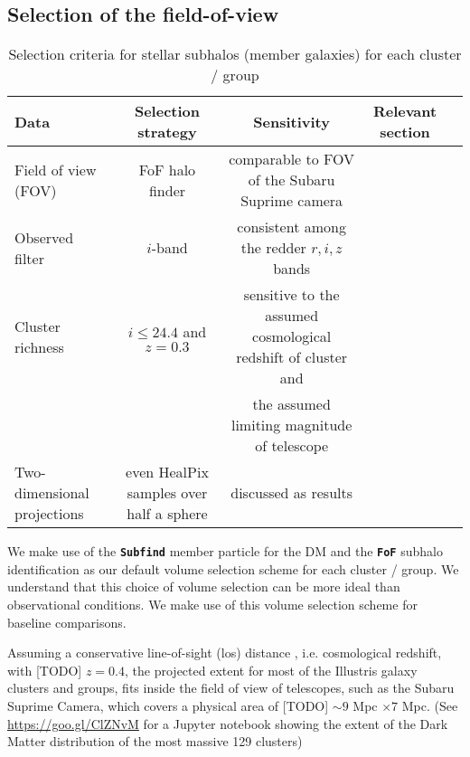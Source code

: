 \subsection{Selection of the field-of-view}
\label{sec:FOV}

\begin{table*}
\begin{center}
\begin{minipage}{180mm} 
	\caption{ Selection criteria for stellar subhalos (member galaxies) for each
		cluster / group 
\label{tab:member_galaxy_selections}} 
	\begin{tabular}{@{}lcccc@{}}
\hline 
Data &  Selection strategy  & Sensitivity & Relevant section  \\ \hline
Field of view (FOV) & FoF halo finder& comparable to FOV of the Subaru
Suprime camera &   \\ 
Observed filter & $i$-band & consistent among the redder $r, i, z$ bands &   \\ 
Cluster richness  & $i \leq 24.4$ and $z = 0.3$  & sensitive to
the assumed cosmological redshift of cluster and &    \\ 
& & the assumed limiting magnitude of telescope &   \\
Two-dimensional projections & even HealPix samples over half a sphere &
discussed as results  & \\  
\hline
\end{tabular} 
\label{tab:selection_criteria} 
\footnotesize{
}
\end{minipage}
\end{center} 
\end{table*}

We make use of the {\bf \texttt{Subfind}} member particle for the DM and the 
{\bf \texttt{FoF}} subhalo identification as our
default volume selection scheme for each cluster / group.
We understand that this choice of volume selection can be more ideal than
observational conditions. We make use of this volume selection scheme
for baseline comparisons. 

Assuming a conservative line-of-sight (los) distance 
, i.e. cosmological redshift, with [TODO] $z = 0.4$, 
the projected extent for most of the Illustris galaxy clusters and groups, 
fits inside the field of view of telescopes, such as the Subaru Suprime Camera,
which covers a physical area of [TODO] $\sim 9$ Mpc $\times 7$ Mpc. 
(See \href{https://goo.gl/ClZNvM}{https://goo.gl/ClZNvM} for a Jupyter notebook 
showing the extent of the Dark Matter distribution of the most massive 129 clusters)

